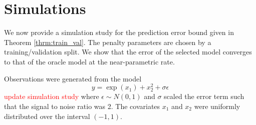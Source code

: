 \documentclass[12pt]{article}
\newtheorem{lemma}{Lemma}
\begin{document}
%
%
%

\section{Simulations}\label{sec:simulations}

We now provide a simulation study for the prediction error bound given in Theorem \ref{thrm:train_val}. The penalty parameters are chosen by a training/validation split. We show that the error of the selected model converges to that of the oracle model at the near-parametric rate.

Observations were generated from the model
\begin{equation}
y = \exp(x_1) + x_2^2 + \sigma \epsilon
\end{equation}
\textcolor{red}{update simulation study}
where $\epsilon \sim N(0,1)$ and $\sigma$ scaled the error term such that the signal to noise ratio was 2.
The covariates $x_1$ and $x_2$ were uniformly distributed over the interval $(-1, 1)$.
\end{document}
